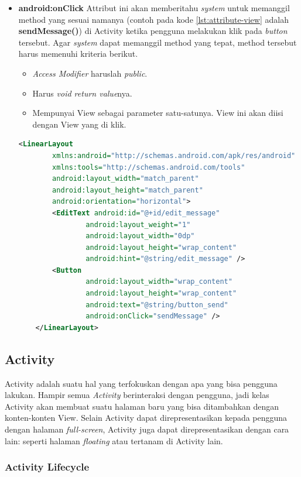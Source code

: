 \begin{itemize}
	\item \textbf{android:onClick}
	Attribut ini akan memberitahu \textit{system} untuk memanggil method yang sesuai namanya (contoh pada kode \ref{lst:attribute-view} adalah \textbf{sendMessage()}) di Activity ketika pengguna melakukan klik pada \textit{button} tersebut. Agar \textit{system} dapat memanggil method yang tepat, method tersebut harus memenuhi kriteria berikut.
	\begin{itemize}
		\item \textit{Access Modifier} haruslah \textit{public}.
		\item Harus \textit{void return value}nya.
		\item Mempunyai View sebagai parameter satu-satunya. View ini akan diisi dengan View yang di klik.
	\end{itemize}
\begin{lstlisting}[caption={Contoh kode file XML pada folder layout},label={lst:attribute-view},language=xml]
	<LinearLayout
		xmlns:android="http://schemas.android.com/apk/res/android"
		xmlns:tools="http://schemas.android.com/tools"
		android:layout_width="match_parent"
		android:layout_height="match_parent"
		android:orientation="horizontal">
		<EditText android:id="@+id/edit_message"
				android:layout_weight="1"
				android:layout_width="0dp"
				android:layout_height="wrap_content"
				android:hint="@string/edit_message" />
		<Button
				android:layout_width="wrap_content"
				android:layout_height="wrap_content"
				android:text="@string/button_send"
				android:onClick="sendMessage" />
	</LinearLayout>
\end{lstlisting}
\end{itemize}


\subsection{Activity}
\label{sec:activity}
\cite{android_developers}
Activity adalah suatu hal yang terfokuskan dengan apa yang bisa pengguna lakukan. Hampir semua \textit{Activity} berinteraksi dengan pengguna, jadi kelas Activity akan membuat suatu halaman baru yang bisa ditambahkan dengan konten-konten View. Selain Activity dapat direpresentasikan kepada pengguna dengan halaman \textit{full-screen}, Activity juga dapat direpresentasikan dengan cara lain: seperti halaman \textit{floating} atau tertanam di Activity lain.

\subsubsection{Activity Lifecycle}

